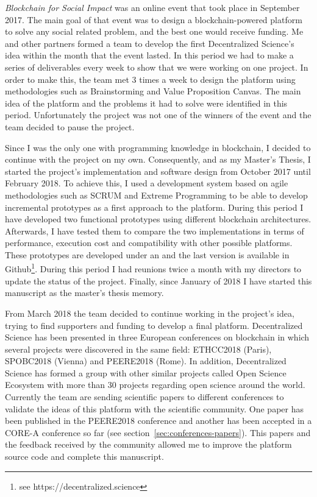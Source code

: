 \begin{itemize}
   \emph{Blockchain for Social Impact} was an online event
  that took place in September 2017. The main goal of that event was to design a
  blockchain-powered platform to solve any social related problem, and the best
  one would receive funding. Me and other partners formed a team to develop the
  first Decentralized Science's idea within the month that the event lasted. In
  this period we had to make a series of deliverables every week to show that we
  were working on one project. In order to make this, the team met 3 times a
  week to design the platform using methodologies such as Brainstorming and
  Value Proposition Canvas. The main idea of the platform and the problems it
  had to solve were identified in this period. Unfortunately the project was not
  one of the winners of the event and the team decided to pause the project.

   Since I was the only one with programming
  knowledge in blockchain, I decided to continue with the project on my own.
  Consequently, and as my Master's Thesis, I started the project's
  implementation and software design from October 2017 until February 2018. To
  achieve this, I used a development system based on agile methodologies such as
  SCRUM and Extreme Programming to be able to develop incremental prototypes as
  a first approach to the platform. During this period I have developed two
  functional prototypes using different blockchain architectures. Afterwards, I
  have tested them to compare the two implementations in terms of performance,
  execution cost and compatibility with other possible platforms. These
  prototypes are developed under an  and the last
  version is available in Github\footnote{see https://decentralized.science}.
  During this period I had reunions twice a month with my directors to update
  the status of the project. Finally, since January of 2018 I have started this
  manuscript as the master's thesis memory.

   From March 2018 the team decided to continue working in
  the project's idea, trying to find supporters and funding to develop a final
  platform. Decentralized Science has been presented in three European
  conferences on blockchain in which several projects were discovered in the
  same field: ETHCC2018 (Paris), SPOBC2018 (Vienna) and PEERE2018 (Rome). In
  addition, Decentralized Science has formed a group with other similar projects
  called Open Science Ecosystem with more than 30 projects regarding open
  science around the world. Currently the team are sending scientific papers to
  different conferences to validate the ideas of this platform with the
  scientific community. One paper has been published in the PEERE2018 conference
  and another has been accepted in a CORE-A conference so far (see
  section~\ref{sec:conferences-papers}). This papers and the feedback received
  by the community allowed me to improve the platform source code and complete
  this manuscript.
  
\end{itemize}

